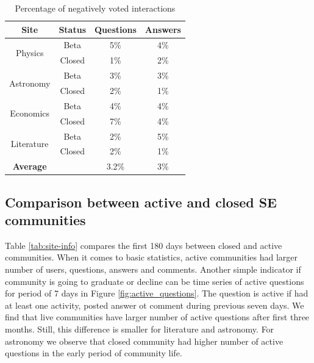 \begin{table}[hbt!]
	\centering
	\caption{Percentage of negatively voted interactions}
	\label{tab:negint}
	\begin{tabular}{cc|cc}

		\hline
		Site                        & Status & Questions & Answers \\ \hline
		\multirow{2}{*}{Physics}    & Beta   & 5\%       & 4\%     \\
		& Closed & 1\%       & 2\%     \\ \hline
		\multirow{2}{*}{Astronomy}  & Beta   & 3\%       & 3\%     \\
		& Closed & 2\%       & 1\%     \\ \hline
		\multirow{2}{*}{Economics}  & Beta   & 4\%       & 4\%     \\
		& Closed & 7\%       & 4\%     \\ \hline
		\multirow{2}{*}{Literature} & Beta   & 2\%       & 5\%     \\ 
		& Closed & 2\%       & 1\%     \\ \hline \hline
		\textbf{Average}            &        & 3.2\%     & 3\%     \\ \hline 
	\end{tabular}
\end{table}




\subsection{Comparison between active and closed SE communities}

Table \ref{tab:site-info} compares the first 180 days between closed and active communities. When it comes to basic statistics, active communities had larger number of users, questions, answers and comments. Another simple indicator if community is going to graduate or decline can be time series of active questions for period of 7 days in Figure \ref{fig:active_questions}. The question is active if had at least one activity, posted answer ot comment during previous seven days. We find that live communities have larger number of active questions after first three months. Still, this difference is smaller for literature and astronomy. For astronomy we observe that closed community had higher number of active questions in the early period of community life. \\~\\


